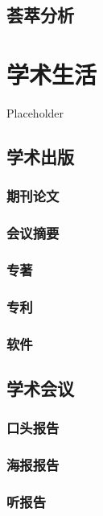 \documentclass[]{book}
\begin{document}
\section{荟萃分析}

\chapter{学术生活}

Placeholder

\section{学术出版}

\subsection{期刊论文}

\subsection{会议摘要}

\subsection{专著}

\subsection{专利}

\subsection{软件}

\section{学术会议}

\subsection{口头报告}

\subsection{海报报告}

\subsection{听报告}
\end{document}

